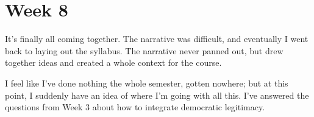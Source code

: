 
\section{Week 8}

It's finally all coming together.  The narrative was difficult, and eventually I went back to laying out the syllabus.  The narrative never panned out, but drew together ideas and created a whole context for the course.

I feel like I've done nothing the whole semester, gotten nowhere; but at this point, I suddenly have an idea of where I'm going with all this.  I've answered the questions from Week 3 about how to integrate democratic legitimacy.

